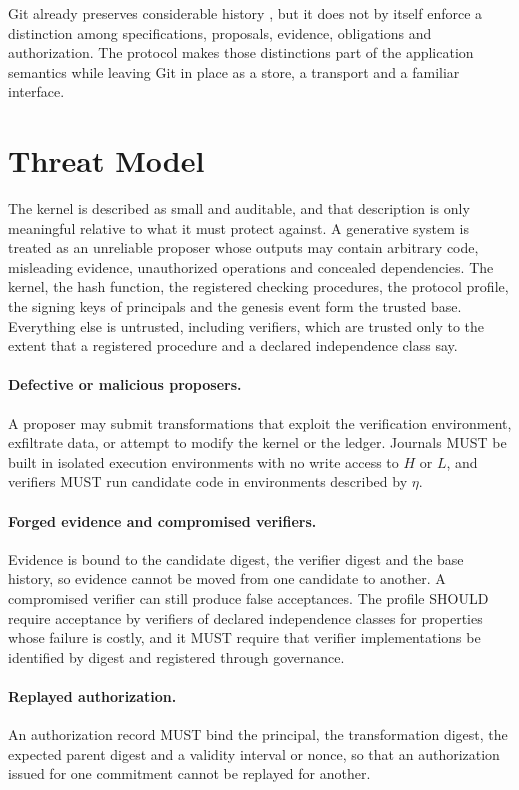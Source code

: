 \documentclass[11pt]{article}
\theoremstyle{remark}
\begin{document}
Git already preserves considerable history \cite{progit}, but it does not by itself enforce a distinction among specifications, proposals, evidence, obligations and authorization. The protocol makes those distinctions part of the application semantics while leaving Git in place as a store, a transport and a familiar interface.

\section{Threat Model}\label{sec:threat}

The kernel is described as small and auditable, and that description is only meaningful relative to what it must protect against. A generative system is treated as an unreliable proposer whose outputs may contain arbitrary code, misleading evidence, unauthorized operations and concealed dependencies. The kernel, the hash function, the registered checking procedures, the protocol profile, the signing keys of principals and the genesis event form the trusted base. Everything else is untrusted, including verifiers, which are trusted only to the extent that a registered procedure and a declared independence class say.

\paragraph{Defective or malicious proposers.} A proposer may submit transformations that exploit the verification environment, exfiltrate data, or attempt to modify the kernel or the ledger. Journals MUST be built in isolated execution environments with no write access to $H$ or $L$, and verifiers MUST run candidate code in environments described by $\eta$.

\paragraph{Forged evidence and compromised verifiers.} Evidence is bound to the candidate digest, the verifier digest and the base history, so evidence cannot be moved from one candidate to another. A compromised verifier can still produce false acceptances. The profile SHOULD require acceptance by verifiers of declared independence classes for properties whose failure is costly, and it MUST require that verifier implementations be identified by digest and registered through governance.

\paragraph{Replayed authorization.} An authorization record MUST bind the principal, the transformation digest, the expected parent digest and a validity interval or nonce, so that an authorization issued for one commitment cannot be replayed for another.
\end{document}
